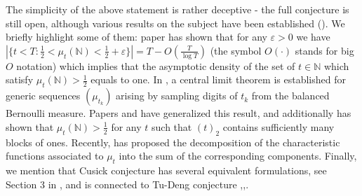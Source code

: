 \documentclass[10pt]{amsart}
\theoremstyle{definition}
\numberwithin{equation}{section}
\newcommand{\eps}{\varepsilon}
\newcommand{\N}{\mathbb{N}}
\begin{document}
The simplicity of the above statement is rather deceptive - the full conjecture is still open, although various  results on the subject have been established (\cite{drmota,Emme1,Emme,Hosten,sp2022,sw2019,sw2023}). We briefly highlight some of them: paper \cite{drmota} has shown that for any $\eps>0$ we have $|\{t<T\colon \frac12<\mu_t(\N)<\frac{1}{2}+\eps\}|=T-O(\frac{T}{\log T})$ (the symbol $O(\cdot)$ stands for big $O$ notation) which implies that the asymptotic density of the set of $t\in\N$ which satisfy $\mu_t(\N)>\frac12$ equals to one. In \cite{Emme}, a central limit theorem is established for generic sequences $(\mu_{t_k})$ arising by sampling digits of $t_k$ from the balanced Bernoulli measure. Papers \cite{Hosten} and \cite{sw2023} have generalized this result, and additionally \cite{sw2023} has shown that $\mu_t(\N)>\frac12$ for any $t$ such that $(t)_2$ contains sufficiently many blocks of ones. Recently, \cite{sobolewski} has proposed the decomposition of the characteristic functions associated to $\mu_t$ into the sum of the corresponding components. Finally, we  mention that Cusick conjecture has several equivalent formulations, see Section 3 in \cite{drmota}, and is  connected to Tu-Deng conjecture \cite{CusickLi},\cite{TuTuDeng},\cite{sw2019}.
\end{document}
